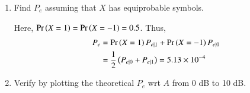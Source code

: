 \documentclass[journal,12pt,twocolumn]{IEEEtran}
\renewcommand\thesection{\arabic{section}}
\begin{document}
\begin{enumerate}[label=\thesection.\arabic*
,ref=\thesection.\theenumi]
Letting $X = 1$ and $X = -1$ respectively, we see the number of mismatched data points to compute the error probabilities. The simulation is coded in
\begin{lstlisting}
wget https://github.com/Anshul-Sangrame/AI1110/blob/main/Assignment/solution/5/5.5.py
\end{lstlisting}
and can be run by typing
\begin{lstlisting}
python3 5.5.py
\end{lstlisting}
The results are
		\begin{align}
			P_{e|0} = 5.02 \times 10^{-4} \\
			P_{e|1} = 5.24 \times 10^{-4}
		\end{align}
%
\item Find $P_e$ assuming that $X$ has equiprobable symbols.

\solution

Here, $\Pr\left(X = 1\right) = \Pr\left(X = -1\right) = 0.5$. Thus,
	\begin{align}
		P_e &= \Pr\left(X = 1\right)P_{e|1} + \Pr\left(X = -1\right)P_{e|0} \label{eq:pe-gen} \\
		&= \frac{1}{2}\left(P_{e|0} + P_{e|1}\right) = 5.13 \times 10^{-4}
	\end{align}
%
\item Verify by plotting the theoretical $P_e$ wrt $A$ from 0 dB to 10 dB.

\solution


\end{enumerate}
\end{document}
